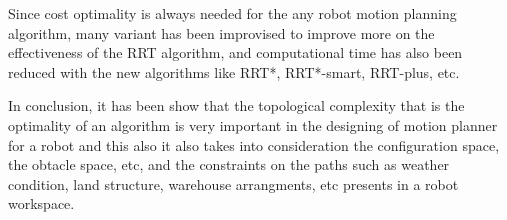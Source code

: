 Since cost optimality is always needed for the any robot motion planning algorithm, many variant has been improvised to improve more on the effectiveness of the RRT algorithm, and computational time has also been reduced with the new algorithms like RRT*, RRT*-smart, RRT-plus, etc.

In conclusion, it has been show that the topological complexity that is the optimality of an algorithm is very important in the designing of motion planner for a robot and this also it also takes into consideration the configuration space, the obtacle space, etc, and the constraints on the paths such as weather condition, land structure, warehouse arrangments, etc presents in a robot workspace.

